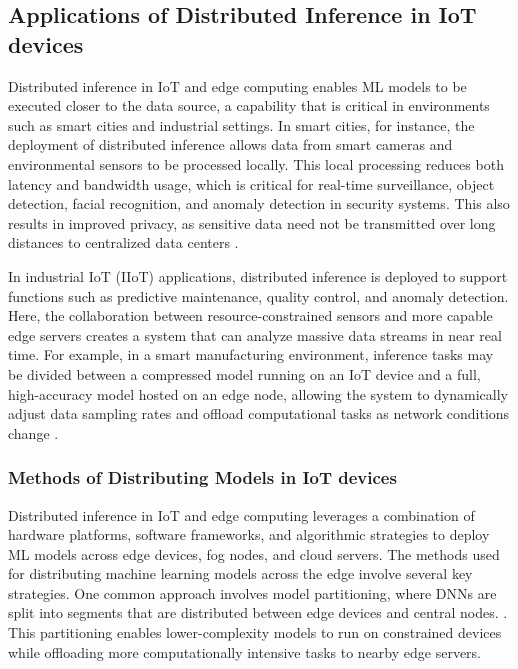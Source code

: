 \documentclass[conference]{IEEEtran}
\begin{document}
\subsection{Applications of Distributed Inference in IoT devices}

Distributed inference in IoT and edge computing enables ML models to be executed closer to the data source, a capability that is critical in environments such as smart cities and industrial settings. In smart cities, for instance, the deployment of distributed inference allows data from smart cameras and environmental sensors to be processed locally. This local processing reduces both latency and bandwidth usage, which is critical for real-time surveillance, object detection, facial recognition, and anomaly detection in security systems. This also results in improved privacy, as sensitive data need not be transmitted over long distances to centralized data centers \cite{grzesik2024combining}.

In industrial IoT (IIoT) applications, distributed inference is deployed to support functions such as predictive maintenance, quality control, and anomaly detection. Here, the collaboration between resource-constrained sensors and more capable edge servers creates a system that can analyze massive data streams in near real time. For example, in a smart manufacturing environment, inference tasks may be divided between a compressed model running on an IoT device and a full, high-accuracy model hosted on an edge node, allowing the system to dynamically adjust data sampling rates and offload computational tasks as network conditions change \cite{grzesik2024combining}.

\subsubsection{Methods of Distributing Models in IoT devices}

Distributed inference in IoT and edge computing leverages a combination of hardware platforms, software frameworks, and algorithmic strategies to deploy ML models across edge devices, fog nodes, and cloud servers. The methods used for distributing machine learning models across the edge involve several key strategies. One common approach involves model partitioning, where DNNs are split into segments that are distributed between edge devices and central nodes.  \cite{filho2022systematic, grzesik2024combining}. This partitioning enables lower-complexity models to run on constrained devices while offloading more computationally intensive tasks to nearby edge servers.
\end{document}
